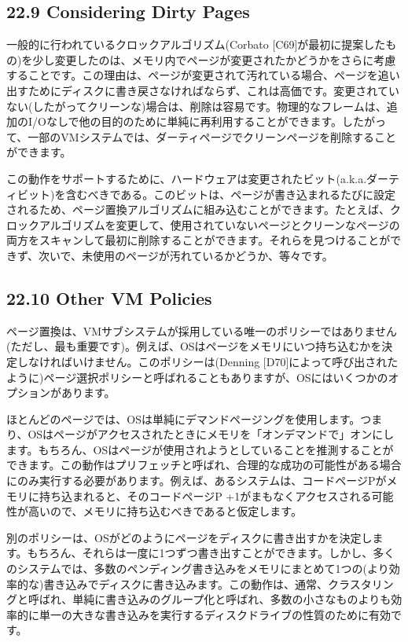 \hypertarget{considering-dirty-pages}{%
\subsection*{22.9 Considering Dirty
Pages}\label{considering-dirty-pages}}

一般的に行われているクロックアルゴリズム(Corbato
{[}C69{]}が最初に提案したもの)を少し変更したのは、メモリ内でページが変更されたかどうかをさらに考慮することです。この理由は、ページが変更されて汚れている場合、ページを追い出すためにディスクに書き戻さなければならず、これは高価です。変更されていない(したがってクリーンな)場合は、削除は容易です。物理的なフレームは、追加のI/Oなしで他の目的のために単純に再利用することができます。したがって、一部のVMシステムでは、ダーティページでクリーンページを削除することができます。

この動作をサポートするために、ハードウェアは変更されたビット(a.k.a.ダーティビット)を含むべきである。このビットは、ページが書き込まれるたびに設定されるため、ページ置換アルゴリズムに組み込むことができます。たとえば、クロックアルゴリズムを変更して、使用されていないページとクリーンなページの両方をスキャンして最初に削除することができます。それらを見つけることができず、次いで、未使用のページが汚れているかどうか、等々です。

\hypertarget{other-vm-policies}{%
\subsection*{22.10 Other VM Policies}\label{other-vm-policies}}

ページ置換は、VMサブシステムが採用している唯一のポリシーではありません(ただし、最も重要です)。例えば、OSはページをメモリにいつ持ち込むかを決定しなければいけません。このポリシーは(Denning
{[}D70{]}によって呼び出されたように)ページ選択ポリシーと呼ばれることもありますが、OSにはいくつかのオプションがあります。

ほとんどのページでは、OSは単純にデマンドページングを使用します。つまり、OSはページがアクセスされたときにメモリを「オンデマンドで」オンにします。もちろん、OSはページが使用されようとしていることを推測することができます。この動作はプリフェッチと呼ばれ、合理的な成功の可能性がある場合にのみ実行する必要があります。例えば、あるシステムは、コードページPがメモリに持ち込まれると、そのコードページP
+1がまもなくアクセスされる可能性が高いので、メモリに持ち込むべきであると仮定します。

別のポリシーは、OSがどのようにページをディスクに書き出すかを決定します。もちろん、それらは一度に1つずつ書き出すことができます。しかし、多くのシステムでは、多数のペンディング書き込みをメモリにまとめて1つの(より効率的な)書き込みでディスクに書き込みます。この動作は、通常、クラスタリングと呼ばれ、単純に書き込みのグループ化と呼ばれ、多数の小さなものよりも効率的に単一の大きな書き込みを実行するディスクドライブの性質のために有効です。

